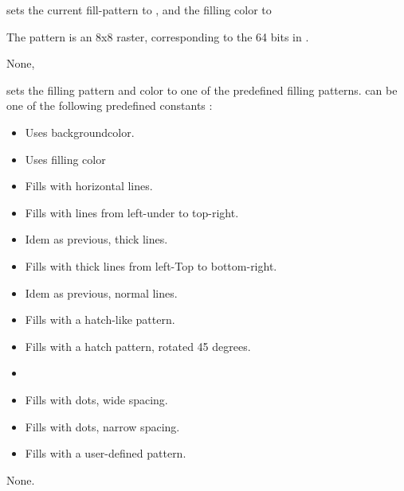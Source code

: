 

{ sets the current fill-pattern to , and
the filling color to 

The pattern is an 8x8 raster, corresponding to the 64 bits in
.}{None}{, }

{ sets the filling pattern and color to one of the
predefined filling patterns.  can be one of the following predefined
constants :
\begin{itemize}
\item {} Uses backgroundcolor.
\item {} Uses filling color
\item {} Fills with horizontal lines.
\item {} Fills with lines from left-under to top-right.
\item {} Idem as previous, thick lines.
\item {} Fills with thick lines from left-Top to bottom-right.
\item {} Idem as previous, normal lines.
\item {}  Fills with a hatch-like pattern.
\item {} Fills with a hatch pattern, rotated 45 degrees.
\item {} 
\item {} Fills with dots, wide spacing.
\item {} Fills with dots, narrow spacing.
\item {} Fills with a user-defined pattern.
\end{itemize}
}{None.}{}



